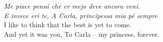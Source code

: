 

\copyrightpage

\commcertpage 

\titlepage              %


\begin{epigraph}
\hfill\begin{minipage}{0.6\textwidth}\raggedleft
{\it Me piace pens\'a che er mejo deve ancora ven\'i. }\\
{\it E invece eri te, A Carla, principessa mia p\'e sempre} \\[0.5cm]
\small{I like to think that the best is yet to come.}\\
\small{And yet it was you, To Carla -- my princess, forever.}
\end{minipage}
\end{epigraph}


